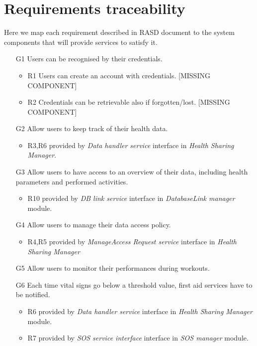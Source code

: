 \documentclass[DD.tex]{subfiles}
\begin{document}
\section{Requirements traceability}
Here we map each requirement described in RASD document to the system components that will provide services to satisfy it.

\begin{itemize}	

	\item [G1] Users can be recognised by their credentials.
	\begin{itemize}
		\item R1 Users can create an account with credentials. [MISSING COMPONENT]
		\item R2 Credentials can be retrievable also if 
		forgotten/lost. [MISSING COMPONENT]
	\end{itemize} 

	\item [G2] Allow users to keep track of their health data.	
	\begin{itemize}
		\item R3,R6 provided by \textit{Data handler service} interface in \textit{Health Sharing Manager}. 
	\end{itemize}
	
	\item [G3] Allow users to have access to an overview of their 
	data, including health parameters and performed activities.
	\begin{itemize}
		\item R10 provided by \textit{DB link service} interface in \textit{DatabaseLink manager} module.
	\end{itemize}
	
	\item [G4] Allow users to manage their data access policy.
	\begin{itemize}
		\item R4,R5 provided by \textit{ManageAccess Request service} interface in \textit{Health Sharing Manager}
	\end{itemize}
	
	\item [G5] Allow users to monitor their performances during 
	workouts.	

	
	\item [G6] Each time vital signs go below a threshold value, first 
	aid services have to be notified.
	\begin{itemize}
		\item R6 provided by \textit{Data handler service} interface in \textit{Health Sharing Manager} module.
		\item R7 provided by \textit{SOS service interface} interface in \textit{SOS manager} module. 
	\end{itemize}
		

\end{itemize}
\end{document}
